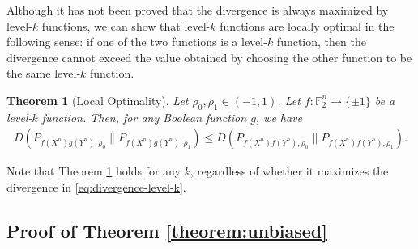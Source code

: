 \documentclass[journal,draftcls, onecolumn]{IEEEtran}
\newtheorem{theorem}{Theorem}
\begin{document}
Although it has not been proved that the divergence is always maximized by level-$k$ functions,
we can show that level-$k$ functions are locally optimal in the following sense:
if one of the two functions is a level-$k$ function, then the divergence cannot exceed the value
obtained by choosing the other function to be the same level-$k$ function. 
\begin{theorem}[Local Optimality] \label{theorem:local-optimality}
Let $\rho_0,\rho_1 \in (-1,1)$.
Let $f:\mathbb{F}_2^n\to \{\pm 1\}$ be a level-$k$ function. Then, for any Boolean function $g$, we have
\begin{align*}
D(P_{f(X^n)g(Y^n),\rho_0} \| P_{f(X^n)g(Y^n),\rho_1}) \le D(P_{f(X^n)f(Y^n),\rho_0} \| P_{f(X^n)f(Y^n),\rho_1}).
\end{align*}
\end{theorem}
Note that Theorem \ref{theorem:local-optimality} holds for any $k$, regardless of whether it maximizes the
divergence in \eqref{eq:divergence-level-k}.

\subsection{Proof of Theorem \ref{theorem:unbiased}}
\end{document}
